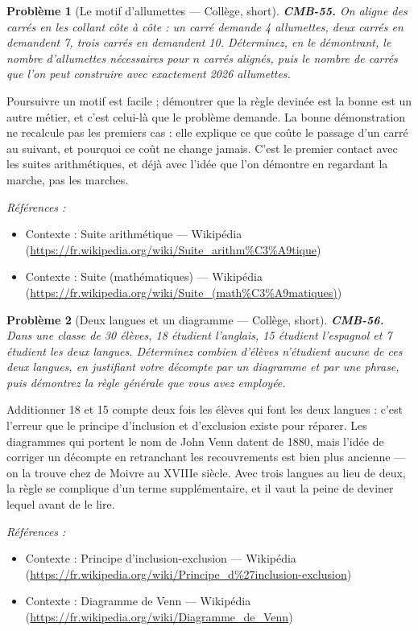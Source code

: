 \documentclass[11pt]{article}
\newtheorem{problem}{Problème}
\newenvironment{refs}{\par\small\noindent\emph{Références :}\begin{itemize}\setlength\itemsep{0pt}}{\end{itemize}\normalsize}
\begin{document}
\begin{problem}[{Le motif d'allumettes --- Collège, short}]
\textbf{CMB-55.} On aligne des carrés en les collant côte à côte : un carré
demande 4 allumettes, deux carrés en demandent 7, trois carrés en demandent 10. Déterminez, en le
démontrant, le nombre d'allumettes nécessaires pour $ n $ carrés alignés, puis le nombre de carrés
que l'on peut construire avec exactement 2026 allumettes.
\end{problem}

\noindent Poursuivre un motif est facile ; démontrer que la règle devinée est la bonne est
un autre métier, et c'est celui-là que le problème demande. La bonne démonstration ne recalcule pas
les premiers cas : elle explique ce que coûte le passage d'un carré au suivant, et pourquoi ce coût
ne change jamais. C'est le premier contact avec les suites arithmétiques, et déjà avec l'idée que
l'on démontre en regardant la marche, pas les marches.

\begin{refs}
\item Contexte : Suite arithmétique --- Wikipédia (\url{https://fr.wikipedia.org/wiki/Suite_arithm%C3%A9tique})
\item Contexte : Suite (mathématiques) --- Wikipédia (\url{https://fr.wikipedia.org/wiki/Suite_(math%C3%A9matiques)})
\end{refs}

\bigskip

\begin{problem}[{Deux langues et un diagramme --- Collège, short}]
\textbf{CMB-56.} Dans une classe de 30 élèves, 18 étudient l'anglais, 15
étudient l'espagnol et 7 étudient les deux langues. Déterminez combien d'élèves n'étudient aucune
de ces deux langues, en justifiant votre décompte par un diagramme et par une phrase, puis démontrez
la règle générale que vous avez employée.
\end{problem}

\noindent Additionner 18 et 15 compte deux fois les élèves qui font les deux langues :
c'est l'erreur que le principe d'inclusion et d'exclusion existe pour réparer. Les diagrammes qui
portent le nom de John Venn datent de 1880, mais l'idée de corriger un décompte en retranchant les
recouvrements est bien plus ancienne --- on la trouve chez de Moivre au XVIIIe siècle. Avec
trois langues au lieu de deux, la règle se complique d'un terme supplémentaire, et il vaut la peine
de deviner lequel avant de le lire.

\begin{refs}
\item Contexte : Principe d'inclusion-exclusion --- Wikipédia (\url{https://fr.wikipedia.org/wiki/Principe_d%27inclusion-exclusion})
\item Contexte : Diagramme de Venn --- Wikipédia (\url{https://fr.wikipedia.org/wiki/Diagramme_de_Venn})
\end{refs}
\end{document}
